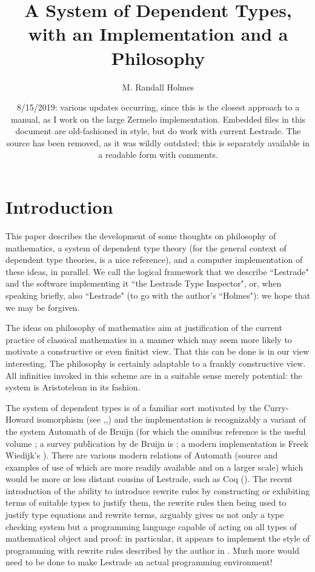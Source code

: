\documentclass[12pt]{article}
\title{A System of Dependent Types, with an Implementation and a Philosophy}
\author{M. Randall Holmes}
\date{8/15/2019:  various updates occurring, since this is the closest approach to a manual, as I work on the large Zermelo implementation.  Embedded files in this document are old-fashioned in style, but do work with current Lestrade.  The source has been removed, as it was wildly outdated;  this is separately available in a readable form with comments.}
\begin{document}
\maketitle

\newpage

\tableofcontents

\newpage

\section{Introduction}

This paper describes the development of some thoughts on philosophy of mathematics, a system of dependent type theory (for the general context of dependent type theories, \cite{barendregt} is a nice reference), and a computer implementation of these ideas, in parallel.  We call the logical framework that we describe ``Lestrade" and the software implementing it ``the Lestrade Type Inspector", or, when speaking briefly, also ``Lestrade"  (to go with the author's ``Holmes"):  we hope that we may be forgiven.

The ideas on philosophy of mathematics aim at justification of the current practice of classical mathematics in a manner which may seem more likely to motivate a constructive or even finitist view.  That this can be done is in our view interesting.   The philosophy is certainly adaptable to a frankly constructive view.  All infinities invoked in this scheme are in a suitable sense merely potential:  the system is Aristotelean in its fashion.

The system of dependent types is of a familiar sort motivated by the Curry-Howard isomorphism (see \cite{curryfeys},\cite{howard},\cite{debruijntypes}) and the implementation is recognizably a variant of the system Automath of de Bruijn (for which the omnibus reference is the useful volume \cite{automathbook}; a survey publication by de Bruijn is \cite{thelanguage};  a modern implementation is Freek Wiedijk's \cite{freek}).  There are various modern relations of Automath (source and examples of use of which are more readily available and on a larger scale) which would be more or less distant cousins of Lestrade, such as Coq  (\cite{coq}).  The recent introduction of the ability to introduce rewrite rules by constructing or exhibiting terms of suitable types to justify them, the rewrite rules then being used to justify type equations and rewrite terms, arguably gives us not only a type checking system but a programming language capable of acting on all types of mathematical object and proof:  in particular, it appears to implement the style of programming with rewrite rules described by the author in \cite{holmesrewriting}.   Much more would need to be done to make Lestrade an actual programming environment!
\end{document}
